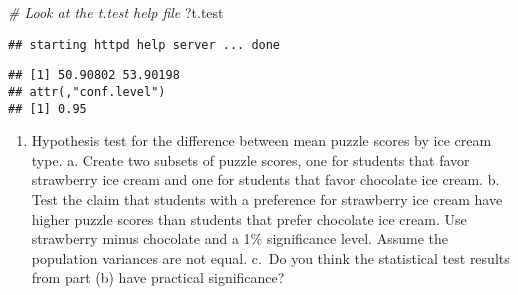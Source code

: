 \documentclass[
]{article}
\newenvironment{Shaded}{\begin{snugshade}}{\end{snugshade}}
\newcommand{\CommentTok}[1]{\textcolor[rgb]{0.56,0.35,0.01}{\textit{#1}}}
\newcommand{\DataTypeTok}[1]{\textcolor[rgb]{0.13,0.29,0.53}{#1}}
\newcommand{\KeywordTok}[1]{\textcolor[rgb]{0.13,0.29,0.53}{\textbf{#1}}}
\newcommand{\NormalTok}[1]{#1}
\newcommand{\OperatorTok}[1]{\textcolor[rgb]{0.81,0.36,0.00}{\textbf{#1}}}
\newcommand{\StringTok}[1]{\textcolor[rgb]{0.31,0.60,0.02}{#1}}
\providecommand{\tightlist}{%
  \setlength{\itemsep}{0pt}\setlength{\parskip}{0pt}}
\begin{document}
\begin{Shaded}
\begin{Highlighting}[]
\CommentTok{# Look at the t.test help file}
\NormalTok{?t.test}
\end{Highlighting}
\end{Shaded}

\begin{verbatim}
## starting httpd help server ... done
\end{verbatim}

\begin{Shaded}
\end{Shaded}

\begin{verbatim}
## [1] 50.90802 53.90198
## attr(,"conf.level")
## [1] 0.95
\end{verbatim}

\begin{enumerate}
\def\labelenumi{\arabic{enumi}.}
\setcounter{enumi}{1}
\tightlist
\item
  Hypothesis test for the difference between mean puzzle scores by ice
  cream type. a. Create two subsets of puzzle scores, one for students
  that favor strawberry ice cream and one for students that favor
  chocolate ice cream. b. Test the claim that students with a preference
  for strawberry ice cream have higher puzzle scores than students that
  prefer chocolate ice cream. Use strawberry minus chocolate and a 1\%
  significance level. Assume the population variances are not equal.
  c.~Do you think the statistical test results from part (b) have
  practical significance?
\end{enumerate}

\begin{Shaded}
\end{Shaded}
\end{document}
